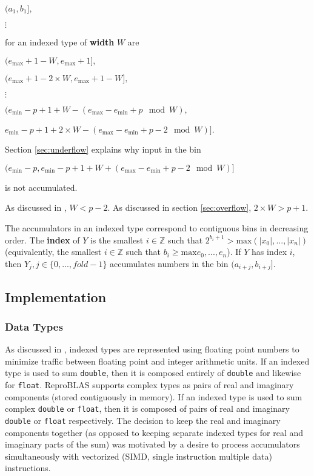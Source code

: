 \documentclass[12pt]{article}
\providecommand{\Z}{\ensuremath{\mathbb{Z}}}
\providecommand{\min}{\ensuremath{\text{min}}}
\providecommand{\max}{\ensuremath{\text{max}}}
\theoremstyle{plain}
\begin{document}
    $(a_1, b_1],$

    $\vdots$

    for an indexed type of \textbf{width} $W$ are

    $(e_{\max} + 1 - W, e_{\max} + 1],$

    $(e_{\max} + 1 - 2\times W, e_{\max} + 1 - W],$

    $\vdots$

    $(e_{\min} - p + 1 + W - (e_{\max} - e_{\min} + p \mod W),$

    \indent \indent $e_{\min} - p + 1 + 2 \times W - (e_{\max} - e_{\min} + p - 2 \mod W)]$.

    Section \ref{sec:underflow} explains why input in the bin

    $(e_{\min} - p, e_{\min} - p + 1 + W + (e_{\max} - e_{\min} + p - 2 \mod W)]$

    is not accumulated.

    As discussed in \cite{repsum}, $W < p - 2$. As discussed in section \ref{sec:overflow}, $2\times W > p + 1$.

    The accumulators in an indexed type correspond to contiguous bins in decreasing order. The \textbf{index} of $Y$ is the smallest $i \in \Z$ such that $2^{b_i + 1} > \max(|x_0|, ..., |x_n|)$ (equivalently, the smallest $i \in \Z$ such that $b_i \geq \max{e_0, ..., e_n}$). If $Y$ has index $i$, then $Y_j, j \in \{0, ..., fold - 1\}$ accumulates numbers in the bin $(a_{i + j}, b_{i + j}]$.

  \subsection{Implementation}
    \subsubsection{Data Types}
      As discussed in \cite{repsum}, indexed types are represented using floating point numbers to minimize traffic between floating point and integer arithmetic units. If an indexed type is used to sum \verb|double|, then it is composed entirely of \verb|double| and likewise for \verb|float|. ReproBLAS supports complex types as pairs of real and imaginary components (stored contiguously in memory). If an indexed type is used to sum complex \verb|double| or \verb|float|, then it is composed of pairs of real and imaginary \verb|double| or \verb|float| respectively. The decision to keep the real and imaginary components together (as opposed to keeping separate indexed types for real and imaginary parts of the sum) was motivated by a desire to process accumulators simultaneously with vectorized (SIMD, single instruction multiple data) instructions.
\end{document}
